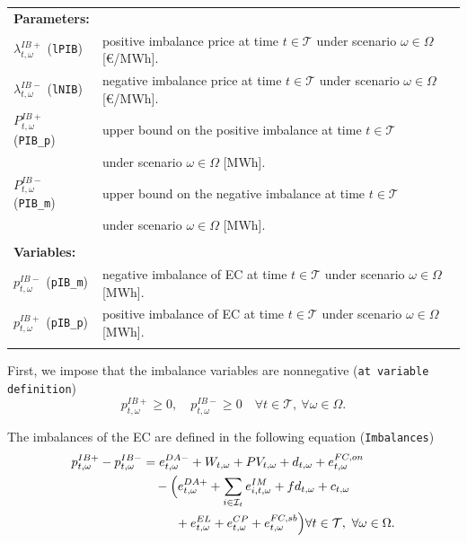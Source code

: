 \documentclass{article}
\begin{document}
\begin{tabularx}{\textwidth}{l l}
    \textbf{Parameters:} \\
    $\lambda^{IB+}_{t, \omega}$ (\verb|lPIB|) & positive imbalance price at time $t \in \mathcal{T}$ under scenario $\omega \in \Omega$ [\euro/MWh]. \\
	$\lambda^{IB-}_{t, \omega}$ (\verb|lNIB|) & negative imbalance price at time $t \in \mathcal{T}$ under scenario $\omega \in \Omega$ [\euro/MWh]. \\
    $P^{IB+}_{t, \omega}$ (\verb|PIB_p|) & upper bound on the positive imbalance at time $t \in \mathcal{T}$ \\
    & under scenario $\omega \in \Omega$ [MWh]. \\
	$P^{IB-}_{t, \omega}$ (\verb|PIB_m|) & upper bound on the negative imbalance at time $t \in \mathcal{T}$ \\ 
	& under scenario $\omega \in \Omega$ [MWh]. \\
    \\ 
       
    \textbf{Variables:} \\
    $p_{t, \omega}^{IB-}$ (\verb|pIB_m|) & negative imbalance of EC at time $t \in \mathcal{T}$ under scenario $\omega \in \Omega$ [MWh].	\\
	$p_{t, \omega}^{IB+}$ (\verb|pIB_p|) & positive imbalance of EC at time $t \in \mathcal{T}$ under scenario $\omega \in \Omega$ [MWh].	\\ 
    \\
\end{tabularx}

First, we impose that the imbalance variables are nonnegative (\verb|at variable definition|)
\begin{equation} \label{EQ:IBVarDef}
    p_{t, \omega}^{IB+} \geq 0, \quad p_{t, \omega}^{IB-} \geq 0 \quad \forall t \in \mathcal{T}, \ \forall \omega \in \Omega.
\end{equation}

The imbalances of the EC are defined in the following equation (\verb|Imbalances|)
\begin{equation} \label{EQ:IBDef}
\begin{split}
  p^{IB+}_{t,\omega} - p^{IB-}_{t,\omega}
  &= e^{DA-}_{t,\omega} + W_{t,\omega} + PV_{t,\omega}
      + d_{t,\omega} + e^{FC,on}_{t,\omega} \\
  &\quad - \Bigl(e^{DA+}_{t,\omega} + \sum_{i \in \mathcal{I}_t} e^{IM}_{i,t,\omega}
      + fd_{t,\omega} + c_{t,\omega} \\
  &\quad\phantom{{}-(} + e^{EL}_{t,\omega} + e^{CP}_{t,\omega} + e^{FC,sb}_{t,\omega}\Bigr)
    \forall t \in \mathcal{T},\ \forall \omega \in \Omega.
\end{split}
\end{equation}
\end{document}
